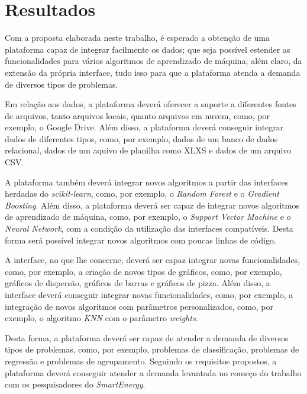 


\chapter{Resultados}
    \label{cha:resultados}

    Com a proposta elaborada neste trabalho, é esperado a obtenção de uma plataforma capaz de integrar facilmente os dados; que seja possível estender as funcionalidades para vários algoritmos de aprendizado de máquina; além claro, da extensão da própria interface, tudo isso para que a plataforma atenda a demanda de diversos tipos de problemas.

    Em relação aos dados, a plataforma deverá oferecer a suporte a diferentes fontes de arquivos, tanto arquivos locais, quanto arquivos em nuvem, como, por exemplo, o Google Drive. Além disso, a plataforma deverá conseguir integrar dados de diferentes tipos, como, por exemplo, dados de um banco de dados relacional, dados de um aquivo de planilha como XLXS e dados de um arquivo CSV.

    A plataforma também deverá integrar novos algoritmos a partir das interfaces herdadas do \textit{scikit-learn}, como, por exemplo, o \textit{Random Forest} e o \textit{Gradient Boosting}. Além disso, a plataforma deverá ser capaz de integrar novos algoritmos de aprendizado de máquina, como, por exemplo, o \textit{Support Vector Machine} e o \textit{Neural Network}, com a condição da utilização das interfaces compatíveis. Desta forma será possível integrar novos algoritmos com poucas linhas de código.

    A interface, no que lhe concerne, deverá ser capaz integrar novas funcionalidades, como, por exemplo, a criação de novos tipos de gráficos, como, por exemplo, gráficos de dispersão, gráficos de barras e gráficos de pizza. Além disso, a interface deverá conseguir integrar novas funcionalidades, como, por exemplo, a integração de novos algoritmos com parâmetros personalizados, como, por exemplo, o algoritmo \textit{KNN} com o parâmetro \textit{weights}.

    Desta forma, a plataforma deverá ser capaz de atender a demanda de diversos tipos de problemas, como, por exemplo, problemas de classificação, problemas de regressão e problemas de agrupamento. Seguindo os requisitos propostos, a plataforma deverá conseguir atender a demanda levantada no começo do trabalho com os pesquisadores do \textit{SmartEnergy}.

